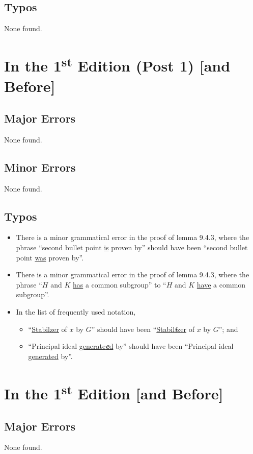 \documentclass[
    a4paper,
    chapterprefix,
    DIV=9
]{scrartcl}
\begin{document}
\subsection*{Typos}
None found.

\section*{In the 1\textsuperscript{st} Edition (Post 1) [and Before]}
\subsection*{Major Errors}
None found.

\subsection*{Minor Errors}
None found.

\subsection*{Typos}
\begin{itemize}
    \item There is a minor grammatical error in the proof of lemma 9.4.3, where the phrase ``second bullet point \underline{is} proven by'' should have been ``second bullet point \underline{was} proven by''.
    \item There is a minor grammatical error in the proof of lemma 9.4.3, where the phrase ``$H$ and $K$ \underline{has} a common subgroup'' to ``$H$ and $K$ \underline{have} a common subgroup''.
    \item In the list of frequently used notation,
    \begin{itemize}
        \item ``\underline{Stabilzer} of $x$ by $G$'' should have been ``\underline{Stabil\textbf{\textit{i}}zer} of $x$ by $G$''; and
        \item ``Principal ideal \underline{generate\textbf{\textit{e}}d} by'' should have been ``Principal ideal \underline{generated} by''.
    \end{itemize}
\end{itemize}

\section*{In the 1\textsuperscript{st} Edition [and Before]}
\subsection*{Major Errors}
None found.
\end{document}
